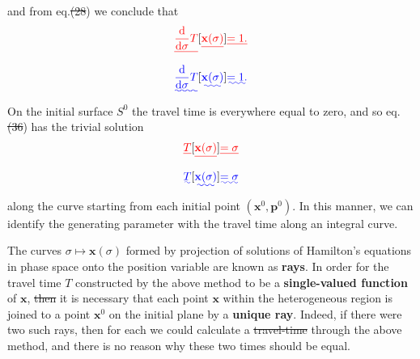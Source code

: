 \documentclass [a4paper,12pt]{paper}
\providecommand{\DIFadd}[1]{{\protect\color{blue}\uwave{#1}}} %
\providecommand{\DIFdel}[1]{{\protect\color{red}\sout{#1}}}                      %
\providecommand{\DIFaddbegin}{} %
\providecommand{\DIFaddend}{} %
\providecommand{\DIFdelbegin}{} %
\providecommand{\DIFdelend}{} %
\begin{document}
and from eq.\DIFdelbegin \DIFdel{(28}\DIFdelend \DIFaddbegin \DIFadd{~(\ref{eq:28}}\DIFaddend ) we conclude that
\DIFdelbegin \begin{displaymath}
\DIFdel{\frac{\ddns }{\ddns \sigma}T}[\DIFdel{\mathbf{x}(\sigma)}]\DIFdel{=1.
}\end{displaymath}%
\DIFdelend \DIFaddbegin \begin{equation}
\DIFadd{\frac{\ddns }{\ddns \sigma}T}[\DIFadd{\mathbf{x}(\sigma)}]\DIFadd{=1.
\label{eq:37}
}\end{equation}\DIFaddend 
On the initial surface $S^{0}$ the travel time is everywhere equal to zero, and so eq.\DIFdelbegin \DIFdel{(36}\DIFdelend \DIFaddbegin \DIFadd{~(\ref{eq:37}}\DIFaddend ) has the trivial solution
\DIFdelbegin \begin{displaymath}
\DIFdel{T}[\DIFdel{\mathbf{x}(\sigma)}]\DIFdel{=\sigma
}\end{displaymath}%
\DIFdelend \DIFaddbegin \begin{equation}
\DIFadd{T}[\DIFadd{\mathbf{x}(\sigma)}]\DIFadd{=\sigma
\label{eq:38}
}\end{equation}\DIFaddend 
along the curve starting from each initial point $(\mathbf{x}^{0},\mathbf{p}^{0})$. In this manner, we can 
identify the generating parameter with the travel time along an integral curve. 

The curves $\sigma\mapsto \mathbf{x}(\sigma)$ formed by projection of solutions of Hamilton's equations in phase space onto the
position variable are known as \textbf{rays}. In order for the travel time $T$ constructed by the above method 
to be a \textbf{single-valued function} of $\mathbf{x}$, \DIFdelbegin \DIFdel{then }\DIFdelend it is necessary that each point $\mathbf{x}$ within the heterogeneous 
region is joined to a point $\mathbf{x}^{0}$ on the initial plane by a \textbf{unique ray}. Indeed, if there were two such 
rays, then for each we could calculate a \DIFdelbegin \DIFdel{travel-time }\DIFdelend \DIFaddbegin \DIFadd{travel time }\DIFaddend through the above method, and there is no reason why these two times 
should be equal. 
\end{document}
